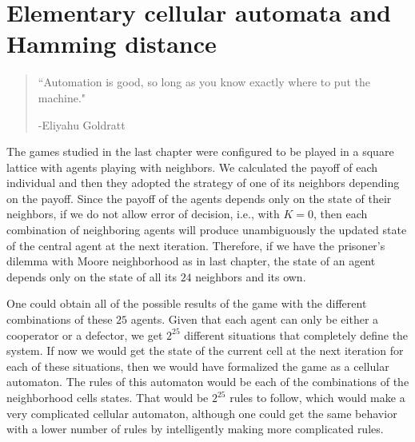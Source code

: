 \chapter{Elementary cellular automata and Hamming distance}
\label{chap:HammingECA}


\begin{quotation}

    \begin{flushright}
    \begin{minipage}[t][5cm][b]{0.5\textwidth}
    { ``Automation is good, so long as you know exactly where to put the machine."}
    
    \bigskip
    
    -{\small  Eliyahu Goldratt}
    \end{minipage}
    \end{flushright}
    
    \vspace{0.5cm}
\end{quotation}



The games studied in the last chapter were configured to be played in a square lattice with agents playing with neighbors. We calculated the payoff of each individual and then they adopted the strategy of one of its neighbors depending on the payoff. Since the payoff of the agents depends only on the state of their neighbors, if we do not allow error of decision, i.e., with $K=0$, then each combination of neighboring agents will produce unambiguously the updated state of the central agent at the next iteration. Therefore, if we have the prisoner's dilemma with Moore neighborhood as in last chapter, the state of an agent depends only on the state of all its $24$ neighbors and its own. 

One could obtain all of the possible results of the game with the different combinations of these $25$ agents. Given that each agent can only be either a cooperator or a defector, we get $2^{25}$ different situations that completely define the system. If now we would get the state of the current cell at the next iteration for each of these situations, then we would have formalized the game as a cellular automaton. The rules of this automaton would be each of the combinations of the neighborhood cells states. That would be $2^{25}$ rules to follow, which would make a very complicated cellular automaton, although one could get the same behavior with a lower number of rules by intelligently making more complicated rules. 

